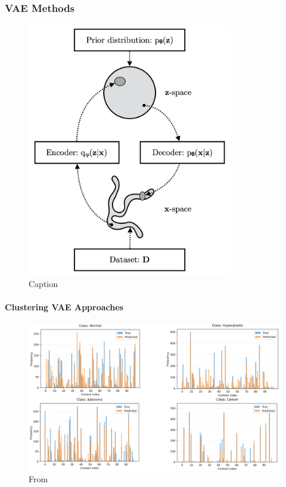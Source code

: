 \subsubsection{VAE Methods}

\begin{figure}[htbp]
  \centering
  \includegraphics[width=0.8\textwidth]{Images/VAE_overview.png}
  \caption{Caption}
  \label{fig:my-label}
\end{figure}

\paragraph{Clustering VAE Approaches}

\begin{figure}[htbp]
  \centering
  \includegraphics[width=1\textwidth]{Images/crime_groupings_by_category_100.png}
  \caption{From \cite{kingma_introduction_nodate}}
  \label{fig:my-label}
\end{figure}

